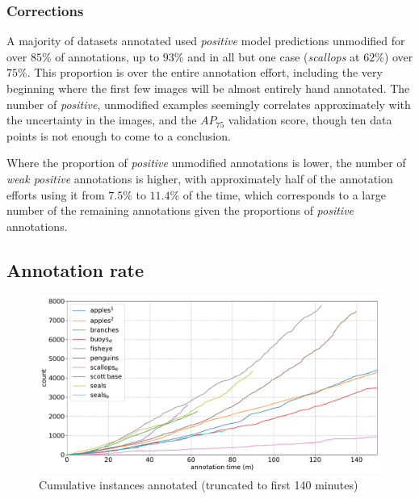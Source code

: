 \subsubsection{Corrections}

A majority of datasets annotated used \emph{positive} model predictions unmodified for over $85\%$ of annotations, up to $93\%$ and in all but one case (\emph{scallops} at $62\%$) over $75\%$. This proportion is over the entire annotation effort, including the very beginning where the first few images will be almost entirely hand annotated. The number of \emph{positive}, unmodified examples seemingly correlates approximately with the uncertainty in the images, and the $AP_{75}$ validation score, though ten data points is not enough to come to a conclusion.

Where the proportion of \emph{positive} unmodified annotations is lower, the number of \emph{weak positive} annotations is higher, with approximately half of the annotation efforts using it from $7.5\%$ to $11.4\%$ of the time, which corresponds to a large number of the remaining annotations given the proportions of \emph{positive} annotations.


\subsection{Annotation rate}
\label{sec:annotation_rate}

\begin{figure}[ht!]
\centering
\includegraphics[width=1.0\linewidth]{charts/summaries/cumulative_instances_crop.pdf}
\caption{ Cumulative instances annotated (truncated to first 140 minutes)  }
\label{fig:cumulative_instances}
\end{figure}


